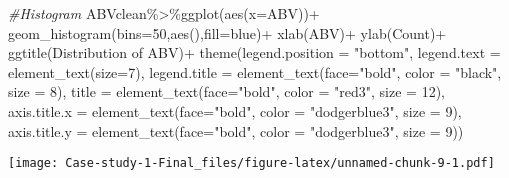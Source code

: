 \documentclass[
]{article}
\newenvironment{Shaded}{\begin{snugshade}}{\end{snugshade}}
\newcommand{\AttributeTok}[1]{\textcolor[rgb]{0.77,0.63,0.00}{#1}}
\newcommand{\CommentTok}[1]{\textcolor[rgb]{0.56,0.35,0.01}{\textit{#1}}}
\newcommand{\DecValTok}[1]{\textcolor[rgb]{0.00,0.00,0.81}{#1}}
\newcommand{\FunctionTok}[1]{\textcolor[rgb]{0.00,0.00,0.00}{#1}}
\newcommand{\NormalTok}[1]{#1}
\newcommand{\SpecialCharTok}[1]{\textcolor[rgb]{0.00,0.00,0.00}{#1}}
\newcommand{\StringTok}[1]{\textcolor[rgb]{0.31,0.60,0.02}{#1}}
\begin{document}
\begin{Shaded}
\begin{Highlighting}[]
\CommentTok{\#Histogram}
\NormalTok{ABVclean}\SpecialCharTok{\%\textgreater{}\%}\FunctionTok{ggplot}\NormalTok{(}\FunctionTok{aes}\NormalTok{(}\AttributeTok{x=}\NormalTok{ABV))}\SpecialCharTok{+} 
  \FunctionTok{geom\_histogram}\NormalTok{(}\AttributeTok{bins=}\DecValTok{50}\NormalTok{,}\FunctionTok{aes}\NormalTok{(),}\AttributeTok{fill=}\StringTok{\textquotesingle{}blue\textquotesingle{}}\NormalTok{)}\SpecialCharTok{+}
  \FunctionTok{xlab}\NormalTok{(}\StringTok{\textquotesingle{}ABV\textquotesingle{}}\NormalTok{)}\SpecialCharTok{+}
  \FunctionTok{ylab}\NormalTok{(}\StringTok{\textquotesingle{}Count\textquotesingle{}}\NormalTok{)}\SpecialCharTok{+}
  \FunctionTok{ggtitle}\NormalTok{(}\StringTok{\textquotesingle{}Distribution of ABV\textquotesingle{}}\NormalTok{)}\SpecialCharTok{+}
  \FunctionTok{theme}\NormalTok{(}\AttributeTok{legend.position =} \StringTok{"bottom"}\NormalTok{,}
        \AttributeTok{legend.text =} \FunctionTok{element\_text}\NormalTok{(}\AttributeTok{size=}\DecValTok{7}\NormalTok{),}
        \AttributeTok{legend.title =} \FunctionTok{element\_text}\NormalTok{(}\AttributeTok{face=}\StringTok{"bold"}\NormalTok{, }\AttributeTok{color =} \StringTok{"black"}\NormalTok{, }\AttributeTok{size =} \DecValTok{8}\NormalTok{),}
        \AttributeTok{title =} \FunctionTok{element\_text}\NormalTok{(}\AttributeTok{face=}\StringTok{"bold"}\NormalTok{, }\AttributeTok{color =} \StringTok{"red3"}\NormalTok{, }\AttributeTok{size =} \DecValTok{12}\NormalTok{),}
        \AttributeTok{axis.title.x =} \FunctionTok{element\_text}\NormalTok{(}\AttributeTok{face=}\StringTok{"bold"}\NormalTok{, }\AttributeTok{color =} \StringTok{"dodgerblue3"}\NormalTok{, }\AttributeTok{size =} \DecValTok{9}\NormalTok{),}
        \AttributeTok{axis.title.y =} \FunctionTok{element\_text}\NormalTok{(}\AttributeTok{face=}\StringTok{"bold"}\NormalTok{, }\AttributeTok{color =} \StringTok{"dodgerblue3"}\NormalTok{, }\AttributeTok{size =} \DecValTok{9}\NormalTok{))}
\end{Highlighting}
\end{Shaded}

\texttt{[image: Case-study-1-Final\_files/figure-latex/unnamed-chunk-9-1.pdf]}
\end{document}
